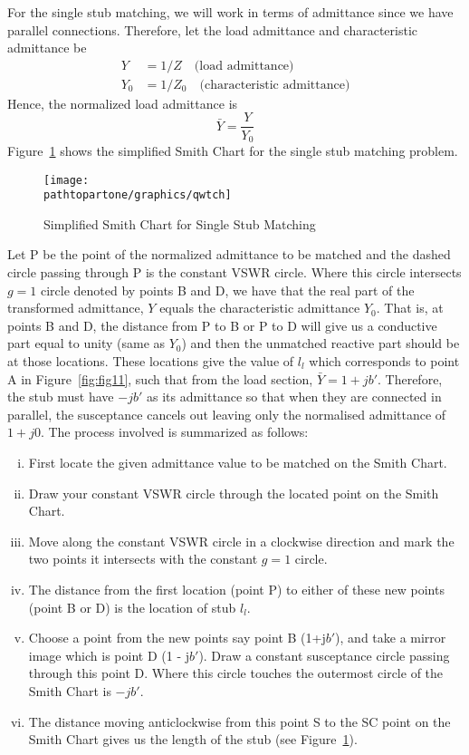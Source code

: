 For the single stub matching, we will work in terms of admittance since we have parallel connections. Therefore, let the load admittance and characteristic admittance be
\begin{align*}
Y &= 1/Z\quad\text{(load admittance)}\\
Y_0 &= 1/Z_0\quad\text{(characteristic admittance)}
\end{align*}
Hence, the normalized load admittance is
\begin{equation*} 
\bar{Y}=\frac{Y}{Y_0} 
\end{equation*}
Figure~\ref{fig:qwtch} shows the simplified Smith Chart for the single stub matching problem.
\begin{figure}[h]
\centering
\texttt{[image: \\pathtopartone/graphics/qwtch]}
\caption{Simplified Smith Chart for Single Stub Matching}
\label{fig:qwtch}
\end{figure}
Let P be the point of the normalized admittance to be matched and the dashed circle passing through P is the constant VSWR circle. Where this circle intersects $g = 1$ circle denoted by points B and D, we have that the real part of the transformed admittance, $Y$ equals the characteristic admittance $Y_0$. That is, at points B and D, the distance from P to B or P to D will give us a conductive part equal to unity (same as $Y_0$) and then the unmatched reactive part should be at those locations. These locations give the value of $l_l$ which corresponds to point A in Figure~\ref{fig:fig11}, such that from the load section, $\bar{Y} = 1 + jb'$. Therefore, the stub must have $-jb'$ as its admittance so that when they are connected in parallel, the susceptance cancels out leaving only the normalised admittance of $1 + j0$. The process involved is summarized as follows:
\begin{enumerate}[(i)]
\item First locate the given admittance value to be matched on the Smith Chart.
\item Draw your constant VSWR circle through the located point on the Smith Chart.
\item Move along the constant VSWR circle in a clockwise direction and mark the two points it intersects with the constant $g = 1$ circle.
\item The distance from the first location (point P) to either of these new points (point B or D) is the location of stub $l_l$.
\item Choose a point from the new points say point B (1+j$b'$), and take a mirror image which is point D (1 - j$b'$). Draw a constant susceptance circle passing through this point D. Where this circle touches the outermost circle of the Smith Chart is $-jb'$.
\item The distance moving anticlockwise from this point S to the SC point on the Smith Chart gives us the length of the stub (see Figure~\ref{fig:qwtch}).
\end{enumerate}

